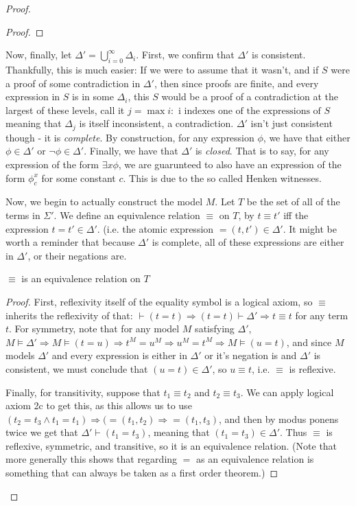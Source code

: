 \begin{proof}
\begin{proof}
    \end{proof}
    Now, finally, let $\Delta' = \bigcup_{i=0}^{\infty}\Delta_i$. First, we confirm that $\Delta'$ is consistent. Thankfully, this is much easier: If we were to assume that it wasn't, and if $S$ were a proof of some contradiction in $\Delta'$, then since proofs are finite, and every expression in $S$ is in some $\Delta_i$, this $S$ would be a proof of a contradiction at the largest of these levels, call it $j = \max{i: \textrm{ i indexes one of the expressions of $S$}}$ meaning that $\Delta_j$ is itself inconsistent, a contradiction. $\Delta'$ isn't just consistent though - it is \textit{complete}. By construction, for any expression $\phi$, we have that either $\phi \in \Delta'$ or $\neg \phi \in \Delta'$. Finally, we have that $\Delta'$ is \textit{closed}. That is to say, for any expression of the form $\exists x \phi$, we are guarunteed to also have an expression of the form $\phi_c^x$ for some constant $c$. This is due to the so called Henken witnesses.
    \par Now, we begin to actually construct the model $M$. Let $T$ be the set of all of the terms in $\Sigma'$. We define an equivalence relation $\equiv$ on $T$, by $t \equiv t'$ iff the expression $t = t' \in \Delta'$. (i.e. the atomic expression $=(t,t') \in \Delta'$. It might be worth a reminder that because $\Delta'$ is complete, all of these expressions are either in $\Delta'$, or their negations are.
    \begin{fact}
        $\equiv$ is an equivalence relation on $T$
    \end{fact}
    \begin{proof}
        First, reflexivity itself of the equality symbol is a logical axiom, so $\equiv$ inherits the reflexivity of that: $\vdash (t = t) \Rightarrow (t = t) \vdash \Delta' \Rightarrow t \equiv t$ for any term $t$.
        For symmetry, note that for any model $M$ satisfying $\Delta'$, $M \models \Delta' \Rightarrow M \models (t = u) \Rightarrow t^M = u^M \Rightarrow u^M = t^M \Rightarrow M \models (u = t)$, and since $M$ models $\Delta'$ and every expression is either in $\Delta'$ or it's negation is and $\Delta'$ is consistent, we must conclude that $(u = t) \in \Delta'$, so $u \equiv t$, i.e. $\equiv$ is reflexive.
        \par Finally, for transitivity, suppose that $t_1 \equiv t_2$ and $t_2 \equiv t_3$. We can apply logical axiom 2c to get this, as this allows us to use $(t_2 = t_3 \wedge t_1 = t_1) \Rightarrow (=(t_1,t_2) \Rightarrow =(t_1,t_3)$, and then by modus ponens twice we get that $\Delta' \vdash (t_1 = t_3)$, meaning that $(t_1 = t_3) \in \Delta'$. Thus $\equiv$ is reflexive, symmetric, and transitive, so it is an equivalence relation. (Note that more generally this shows that regarding $=$ as an equivalence relation is something that can always be taken as a first order theorem.)

\end{proof}
\end{proof}
